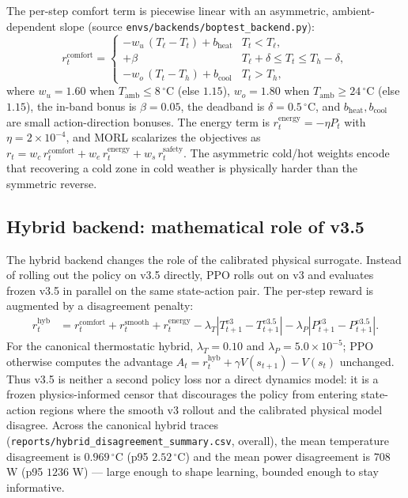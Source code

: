 \documentclass[11pt,a4paper]{article}
\begin{document}
The per-step comfort term is piecewise linear with an asymmetric, ambient-dependent slope (source \texttt{envs/backends/boptest\_backend.py}):
\begin{equation}
  r^{\mathrm{comfort}}_t =
  \begin{cases}
    -w_u\,(T_{\ell} - T_t) + b_{\mathrm{heat}} & T_t < T_{\ell}, \\
    +\beta & T_{\ell}+\delta \le T_t \le T_h-\delta, \\
    -w_o\,(T_t - T_h) + b_{\mathrm{cool}} & T_t > T_h,
  \end{cases}
  \label{eq:comfort}
\end{equation}
where $w_u=1.60$ when $T_{\mathrm{amb}}\le 8\,^\circ$C (else $1.15$), $w_o=1.80$ when $T_{\mathrm{amb}}\ge 24\,^\circ$C (else $1.15$), the in-band bonus is $\beta=0.05$, the deadband is $\delta=0.5\,^\circ$C, and $b_{\mathrm{heat}},b_{\mathrm{cool}}$ are small action-direction bonuses. The energy term is $r^{\mathrm{energy}}_t=-\eta P_t$ with $\eta=2\times10^{-4}$, and MORL scalarizes the objectives as $r_t = w_c\,r^{\mathrm{comfort}}_t + w_e\,r^{\mathrm{energy}}_t + w_s\,r^{\mathrm{safety}}_t$. The asymmetric cold/hot weights encode that recovering a cold zone in cold weather is physically harder than the symmetric reverse.

\subsection{Hybrid backend: mathematical role of v3.5}

The hybrid backend changes the role of the calibrated physical surrogate. Instead of rolling out the policy on v3.5 directly, PPO rolls out on v3 and evaluates frozen v3.5 in parallel on the same state-action pair. The per-step reward is augmented by a disagreement penalty:
\begin{align}
  r^{\mathrm{hyb}}_t
  &= r^{\mathrm{comfort}}_t + r^{\mathrm{smooth}}_t + r^{\mathrm{energy}}_t
  - \lambda_T \left|T^{v3}_{t+1}-T^{v3.5}_{t+1}\right|
  - \lambda_P \left|P^{v3}_{t+1}-P^{v3.5}_{t+1}\right|.
  \label{eq:hybrid_reward}
\end{align}
For the canonical thermostatic hybrid, $\lambda_T=0.10$ and $\lambda_P=5.0\times 10^{-5}$; PPO otherwise computes the advantage $A_t = r^{\mathrm{hyb}}_t + \gamma V(s_{t+1}) - V(s_t)$ unchanged. Thus v3.5 is neither a second policy loss nor a direct dynamics model: it is a frozen physics-informed censor that discourages the policy from entering state-action regions where the smooth v3 rollout and the calibrated physical model disagree. Across the canonical hybrid traces (\texttt{reports/hybrid\_disagreement\_summary.csv}, overall), the mean temperature disagreement is $0.969\,^\circ$C (p95 $2.52\,^\circ$C) and the mean power disagreement is $708$ W (p95 $1236$ W) --- large enough to shape learning, bounded enough to stay informative.
\end{document}
